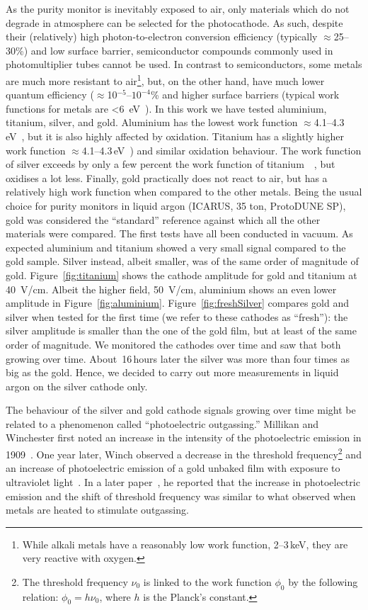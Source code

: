 \documentclass[a4paper,11pt]{article}
\begin{document}
As the purity monitor is inevitably exposed to air, only materials which do not degrade in atmosphere can be selected for the photocathode. As such, despite their (relatively) high photon-to-electron conversion efficiency (typically $\approx$25--30\%) and low surface barrier, semiconductor compounds commonly used in photomultiplier tubes cannot be used. In contrast to semiconductors, some metals are much more resistant to air\footnote{While alkali metals have a reasonably low work function, 2--3\,keV, they are very reactive with oxygen.}, but, on the other hand, have much lower quantum efficiency ($\approx$10$^{-5}$--$10^{-4}$\% and higher surface barriers (typical work functions for metals are \SI{<6}{eV}~\cite{holzl1979work}). In this work we have tested aluminium, titanium, silver, and gold. Aluminium has the lowest work function $\approx$4.1--4.3\,eV~\cite{holzl1979work, green1969solid,Michaelson}, but it is also highly affected by oxidation. Titanium has a slightly higher work function $\approx$4.1--4.3\,eV~\cite{holzl1979work, green1969solid,Michaelson}) and similar oxidation behaviour. The work function of silver exceeds by only a few percent the work function of titanium~~\cite{silver}, but oxidises a lot less. Finally, gold practically does not react to air, but has a relatively high work function when compared to the other metals.
Being the usual choice for purity monitors in liquid argon (ICARUS, 35 ton, ProtoDUNE SP), gold was considered the ``standard'' reference against which all the other materials were compared. 
The first tests have all been conducted in vacuum. As expected aluminium and titanium showed  a very small signal compared to the gold sample. Silver instead, albeit smaller, was of the same order of magnitude of gold. Figure~\ref{fig:titanium} shows the cathode amplitude for gold and titanium at \SI{40}{V/cm}. Albeit the higher field, \SI{50}{V/cm}, aluminium shows an even lower amplitude in Figure~\ref{fig:aluminium}. Figure~\ref{fig:freshSilver} compares gold and silver when tested for the first time (we refer to these cathodes as ``fresh''): the silver amplitude is smaller than the one of the gold film, but at least of the same order of magnitude. We monitored the cathodes over time and saw that both growing over time. About~16\,hours later the silver was more than four times as big as the gold. Hence, we decided to carry out more measurements in liquid argon on the silver cathode only.

The behaviour of the silver and gold cathode signals growing over time might be related to a phenomenon called ``photoelectric outgassing.'' Millikan and Winchester first noted an increase in the intensity of the photoelectric emission in 1909~\cite{Millikan1909}. One year later, Winch observed a decrease in the threshold frequency\footnote{The threshold frequency $\nu_0$ is linked to the work function $\phi_0$ by the following relation: $\phi_0 = h\nu_0$, 
where $h$ is the Planck's constant.} and an increase of photoelectric emission of a gold unbaked film with exposure to ultraviolet light~\cite{Winch1930}. In a later paper~\cite{Winch1931}, he reported that the increase in photoelectric emission and the shift of threshold frequency was similar to what observed when metals are heated to stimulate outgassing.
\end{document}
